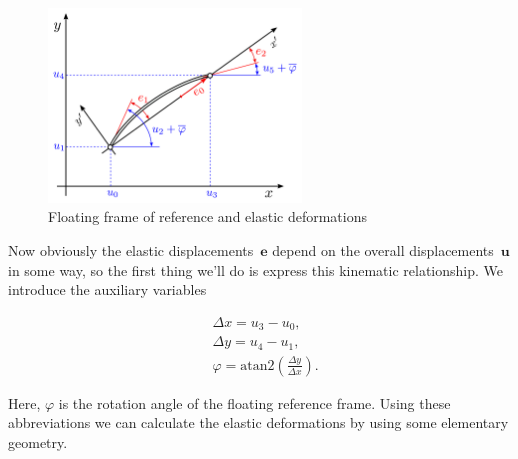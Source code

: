 \begin{figure}[h]
\centering
\includegraphics[width=0.6\textwidth]{figures/elements/beam-element-2}
\caption{Floating frame of reference and elastic deformations}
\label{fig:beam-element-2}
\end{figure}

Now obviously the elastic displacements~$\boldsymbol{e}$ depend on the overall displacements~$\boldsymbol{u}$ in some way, so the first thing we'll do is express this kinematic relationship. We introduce the auxiliary variables

\begin{align}
&\Delta x = u_3 - u_0,\\
&\Delta y = u_4 - u_1,\\
&\varphi = \mathrm{atan2} \left( \frac{\Delta y}{\Delta x} \right).
\end{align}

Here, $\varphi$ is the rotation angle of the floating reference frame. Using these abbreviations we can calculate the elastic deformations by using some elementary geometry.

